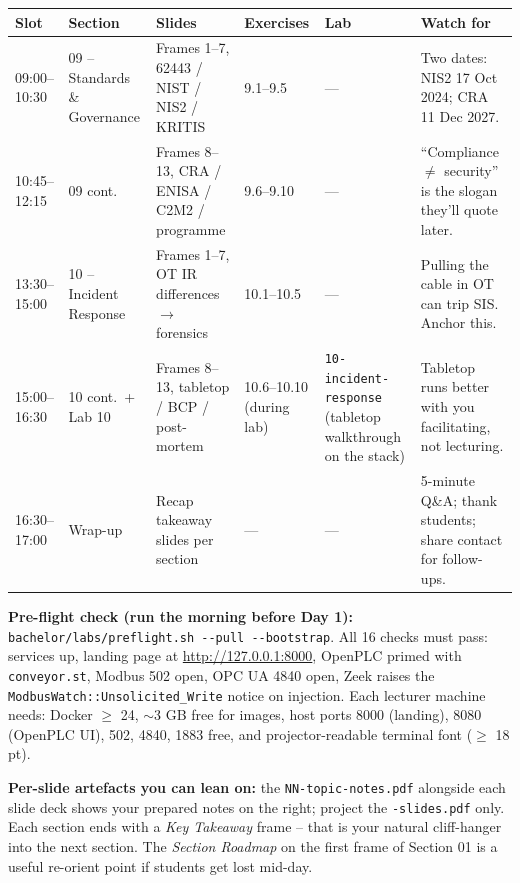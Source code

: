 \documentclass[10pt,a4paper,landscape]{article}
\newcommand{\hint}[1]{%
  \begin{tcolorbox}[colback=tipBg, colframe=slideBlue, boxrule=0.4pt, arc=2pt,
    left=2mm, right=2mm, top=1mm, bottom=1mm, fontupper=\footnotesize]%
  #1%
  \end{tcolorbox}%
}
\begin{document}
\begin{tabular}{|p{2.2cm}|p{4.0cm}|p{4.2cm}|p{4.0cm}|p{4.8cm}|p{4.0cm}|}
\hline
\rowcolor{slidePanel}
\textbf{Slot} & \textbf{Section} & \textbf{Slides} & \textbf{Exercises} & \textbf{Lab} & \textbf{Watch for} \\
\hline
09:00--10:30 & 09 -- Standards \& Governance & Frames 1--7, 62443 / NIST / NIS2 / KRITIS & 9.1--9.5 & --- & Two dates: NIS2 17 Oct 2024; CRA 11 Dec 2027. \\
\hline
10:45--12:15 & 09 cont. & Frames 8--13, CRA / ENISA / C2M2 / programme & 9.6--9.10 & --- & ``Compliance $\neq$ security'' is the slogan they'll quote later. \\
\hline
13:30--15:00 & 10 -- Incident Response & Frames 1--7, OT IR differences $\to$ forensics & 10.1--10.5 & --- & Pulling the cable in OT can trip SIS. Anchor this. \\
\hline
15:00--16:30 & 10 cont.\ + Lab 10 & Frames 8--13, tabletop / BCP / post-mortem & 10.6--10.10 (during lab) & \texttt{10-incident-response} (tabletop walkthrough on the stack) & Tabletop runs better with you facilitating, not lecturing. \\
\hline
16:30--17:00 & Wrap-up & Recap takeaway slides per section & --- & --- & 5-minute Q\&A; thank students; share contact for follow-ups. \\
\hline
\end{tabular}

\vspace{3mm}

\hint{%
\textbf{Pre-flight check (run the morning before Day 1):}
\texttt{bachelor/labs/preflight.sh -{}-pull -{}-bootstrap}.
All 16 checks must pass: services up, landing page at \url{http://127.0.0.1:8000}, OpenPLC primed with \texttt{conveyor.st}, Modbus 502 open, OPC UA 4840 open, Zeek raises the \texttt{ModbusWatch::Unsolicited\_Write} notice on injection.
Each lecturer machine needs: Docker $\geq$ 24, $\sim$3 GB free for images, host ports 8000 (landing), 8080 (OpenPLC UI), 502, 4840, 1883 free, and projector-readable terminal font ($\geq$ 18 pt).
}

\hint{%
\textbf{Per-slide artefacts you can lean on:}
the \texttt{NN-topic-notes.pdf} alongside each slide deck shows your prepared notes on the right; project the \texttt{-slides.pdf} only.
Each section ends with a \emph{Key Takeaway} frame -- that is your natural cliff-hanger into the next section. The \emph{Section Roadmap} on the first frame of Section 01 is a useful re-orient point if students get lost mid-day.
}
\end{document}
